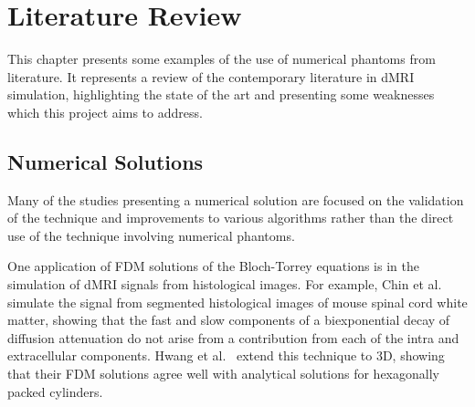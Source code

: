 \chapter{Literature Review}
\label{chap:literature_review}

\chaptertoc{}

\begin{chapterabstract}
  This chapter presents some examples of the use of numerical phantoms from literature.
  It represents a review of the contemporary literature in \ac{dMRI} simulation, highlighting the state of the art and presenting some weaknesses which this project aims to address. 
\end{chapterabstract}




 

\section{Numerical Solutions}
\label{sec:app_numerical_solutions}
Many of the studies presenting a numerical solution are focused on the validation of the technique and improvements to various algorithms rather than the direct use of the technique involving numerical phantoms.

One application of \ac{FDM} solutions of the Bloch-Torrey equations is in the simulation of \ac{dMRI} signals from histological images.
For example, Chin et al.\ \cite{Chin2002} simulate the signal from segmented histological images of mouse spinal cord white matter, showing that the fast and slow components of a biexponential decay of diffusion attenuation do not arise from a contribution from each of the intra and extracellular components.
Hwang et al.\ \cite{Hwang2003} extend this technique to 3D, showing that their \ac{FDM} solutions agree well with analytical solutions for hexagonally packed cylinders. 

